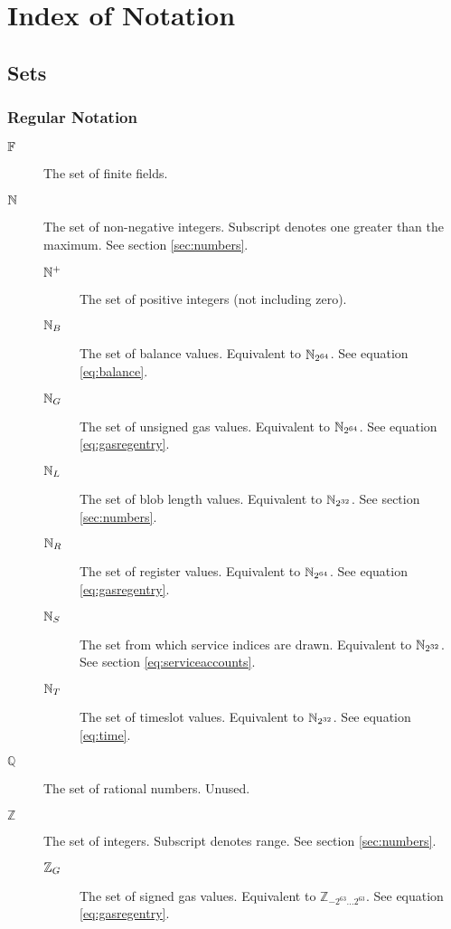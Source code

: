 \section{Index of Notation}\label{sec:definitions}

\subsection{Sets}

\subsubsection{Regular Notation}
\begin{description}
  \item[$\mathbb{F}$] The set of finite fields.
  \item[$\mathbb{N}$] The set of non-negative integers. Subscript denotes one greater than the maximum. See section \ref{sec:numbers}.
  \begin{description}
    \item[$\mathbb{N}^+$] The set of positive integers (not including zero).
    \item[$\mathbb{N}_B$] The set of balance values. Equivalent to $\mathbb{N}_{2^{64}}$. See equation \ref{eq:balance}.
    \item[$\mathbb{N}_G$] The set of unsigned gas values. Equivalent to $\mathbb{N}_{2^{64}}$. See equation \ref{eq:gasregentry}.
    \item[$\mathbb{N}_L$] The set of blob length values. Equivalent to $\mathbb{N}_{2^{32}}$. See section \ref{sec:numbers}.
    \item[$\mathbb{N}_R$] The set of register values. Equivalent to $\mathbb{N}_{2^{64}}$. See equation \ref{eq:gasregentry}.
    \item[$\mathbb{N}_S$] The set from which service indices are drawn. Equivalent to $\mathbb{N}_{2^{32}}$. See section \ref{eq:serviceaccounts}.
    \item[$\mathbb{N}_T$] The set of timeslot values. Equivalent to $\mathbb{N}_{2^{32}}$. See equation \ref{eq:time}.
  \end{description}
  \item[$\mathbb{Q}$] The set of rational numbers. Unused.
  \item[$\mathbb{Z}$] The set of integers. Subscript denotes range. See section \ref{sec:numbers}.
  \begin{description}
    \item[$\mathbb{Z}_G$] The set of signed gas values. Equivalent to $\mathbb{Z}_{-2^{63}\dots2^{63}}$. See equation \ref{eq:gasregentry}.
  \end{description}
\end{description}

